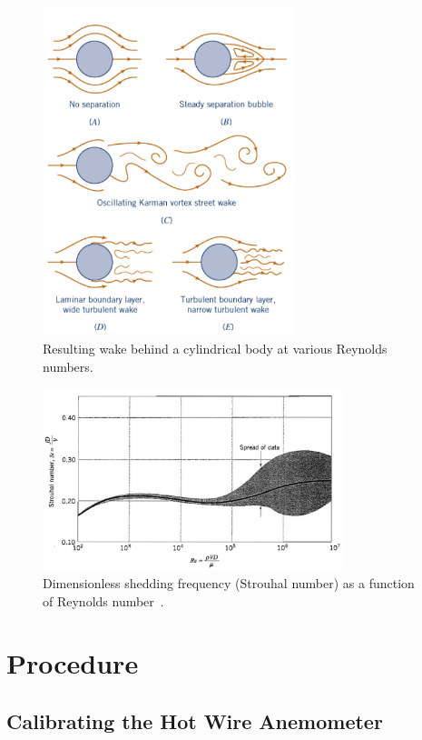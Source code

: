 \documentclass[journal,letterpaper]{IEEEtran}
\begin{document}
\begin{figure}[H]
    \centering
    \includegraphics[width=2.9in]{wake}
    \caption{Resulting wake behind a cylindrical body at various Reynolds numbers.}
    \label{fig:wake}
\end{figure}
\begin{figure}[H]
    \centering
    \includegraphics[width=3.45in]{Strouhal}
    \caption{Dimensionless shedding frequency (Strouhal number) as a function of Reynolds number~\cite{StrouhalPlot}.}
    \label{fig:strouhal}
\end{figure}

\section{Procedure}

\subsection{Calibrating the Hot Wire Anemometer}
\end{document}
